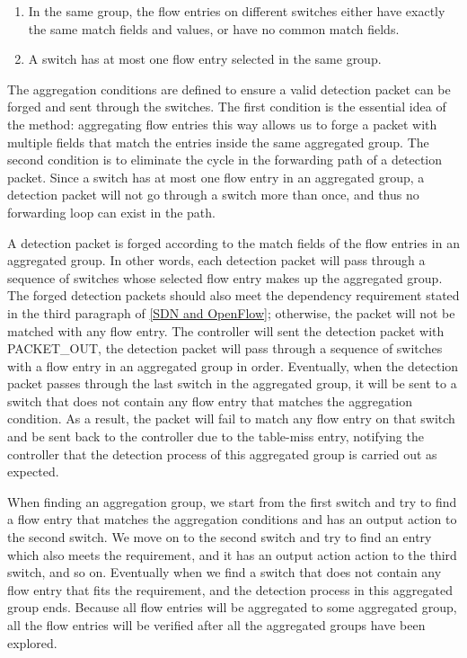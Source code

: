 \begin{enumerate}
\item
In the same group, the flow entries on different switches either have exactly the same match fields and values, or have no common match fields.
\item
A switch has at most one flow entry selected in the same group. 
\end{enumerate}

The aggregation conditions are defined to ensure a valid detection packet can be forged and sent through the switches. The first condition is the essential idea of the method: aggregating flow entries this way allows us to forge a packet with multiple fields that match the entries inside the same aggregated group. The second condition is to eliminate the cycle in the forwarding path of a detection packet. Since a switch has at most one flow entry in an aggregated group, a detection packet will not go through a switch more than once, and thus no forwarding loop can exist in the path.

A detection packet is forged according to the match fields of the flow entries in an aggregated group. In other words, each detection packet will pass through a sequence of switches whose selected flow entry makes up the aggregated group. The forged detection packets should also meet the dependency requirement stated in the third paragraph of \ref{SDN and OpenFlow}; otherwise, the packet will not be matched with any flow entry. The controller will sent the detection packet with PACKET\_OUT, the detection packet will pass through a sequence of switches with a flow entry in an aggregated group in order. Eventually, when the detection packet passes through the last switch in the aggregated group, it will be sent to a switch that does not contain any flow entry that matches the aggregation condition. As a result, the packet will fail to match any flow entry on that switch and be sent back to the controller due to the table-miss entry, notifying the controller that the detection process of this aggregated group is carried out as expected. 

When finding an aggregation group, we start from the first switch and try to find a flow entry that matches the aggregation conditions and has an output action to the second switch. We move on to the second switch and try to find an entry which also meets the requirement, and it has an output action action to the third switch, and so on. Eventually when we find a switch that does not contain any flow entry that fits the requirement, and the detection process in this aggregated group ends. Because all flow entries will be aggregated to some aggregated group, all the flow entries will be verified after all the aggregated groups have been explored.

